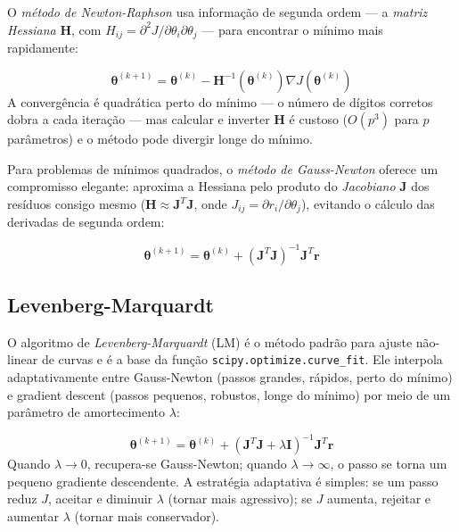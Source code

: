 O \emph{método de Newton-Raphson} usa informação de segunda ordem --- a \emph{matriz
Hessiana} $\mathbf{H}$, com $H_{ij} = \partial^2 J / \partial \theta_i \partial \theta_j$
--- para encontrar o mínimo mais rapidamente:

\begin{equation}
\boldsymbol{\theta}^{(k+1)} = \boldsymbol{\theta}^{(k)} - \mathbf{H}^{-1}(\boldsymbol{\theta}^{(k)}) \nabla J(\boldsymbol{\theta}^{(k)})
\end{equation}
A convergência é quadrática perto do mínimo --- o número de dígitos corretos dobra a cada
iteração --- mas calcular e inverter $\mathbf{H}$ é custoso ($O(p^3)$ para $p$ parâmetros)
e o método pode divergir longe do mínimo.

Para problemas de mínimos quadrados, o \emph{método de Gauss-Newton} oferece um compromisso
elegante: aproxima a Hessiana pelo produto do \emph{Jacobiano} $\mathbf{J}$ dos resíduos
consigo mesmo ($\mathbf{H} \approx \mathbf{J}^T \mathbf{J}$, onde $J_{ij} = \partial r_i / \partial \theta_j$),
evitando o cálculo das derivadas de segunda ordem:

\begin{equation}
\boldsymbol{\theta}^{(k+1)} = \boldsymbol{\theta}^{(k)} + (\mathbf{J}^T \mathbf{J})^{-1} \mathbf{J}^T \mathbf{r}
\end{equation}

\subsection{Levenberg-Marquardt}

O algoritmo de \emph{Levenberg-Marquardt} (LM) é o método padrão para ajuste não-linear
de curvas e é a base da função \texttt{scipy.optimize.curve\_fit}. Ele interpola
adaptativamente entre Gauss-Newton (passos grandes, rápidos, perto do mínimo) e gradient
descent (passos pequenos, robustos, longe do mínimo) por meio de um parâmetro de
amortecimento $\lambda$:

\begin{equation}
\boldsymbol{\theta}^{(k+1)} = \boldsymbol{\theta}^{(k)} + (\mathbf{J}^T \mathbf{J} + \lambda \mathbf{I})^{-1} \mathbf{J}^T \mathbf{r}
\end{equation}
Quando $\lambda \to 0$, recupera-se Gauss-Newton; quando $\lambda \to \infty$, o passo se
torna um pequeno gradiente descendente. A estratégia adaptativa é simples: se um passo
reduz $J$, aceitar e diminuir $\lambda$ (tornar mais agressivo); se $J$ aumenta, rejeitar e
aumentar $\lambda$ (tornar mais conservador).

